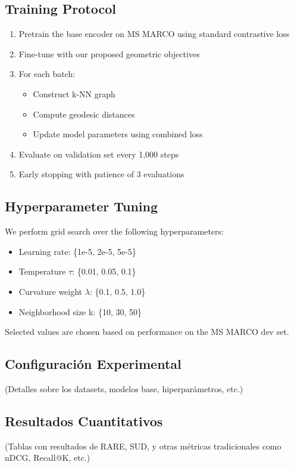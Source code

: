 \subsection{Training Protocol}

\begin{enumerate}
    \item Pretrain the base encoder on MS MARCO using standard contrastive loss
    \item Fine-tune with our proposed geometric objectives
    \item For each batch:
    \begin{itemize}
        \item Construct k-NN graph
        \item Compute geodesic distances
        \item Update model parameters using combined loss
    \end{itemize}
    \item Evaluate on validation set every 1,000 steps
    \item Early stopping with patience of 3 evaluations
\end{enumerate}

\subsection{Hyperparameter Tuning}

We perform grid search over the following hyperparameters:

\begin{itemize}
    \item Learning rate: \{1e-5, 2e-5, 5e-5\}
    \item Temperature $\tau$: \{0.01, 0.05, 0.1\}
    \item Curvature weight $\lambda$: \{0.1, 0.5, 1.0\}
    \item Neighborhood size k: \{10, 30, 50\}
\end{itemize}

Selected values are chosen based on performance on the MS MARCO dev set.

\subsection{Configuración Experimental}
(Detalles sobre los datasets, modelos base, hiperparámetros, etc.)

\subsection{Resultados Cuantitativos}
(Tablas con resultados de RARE, SUD, y otras métricas tradicionales como nDCG, Recall@K, etc.)
